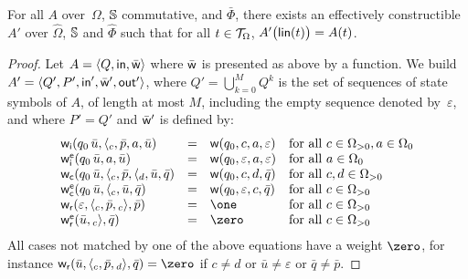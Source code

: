 \begin{proposition}\label{lem:SWTA}
For all \SWTA $A$ over~$\Omega$, $\mathbb{S}$ commutative, and $\bar\Phi$,
there exists an effectively constructible \SWVPA $A'$ over
$\hat\Omega$, $\mathbb{S}$ and $\hat\Phi$
such that for all $t \in \mathcal{T}_\Omega$, $A'\bigl(\mathsf{lin}(t)\bigr) = A(t)$.
\end{proposition}
%
\begin{proof}
Let $A = \< Q, \init, \bar{\wei} >$ where $\bar{\mathsf{w}}$ is presented as above by a function.
We build
$A' = \< Q', P', \init', \bar{\wei}', \final' >$,
where $Q' = \bigcup_{k=0}^{M} Q^k$ is the set of sequences of state symbols of $A$,
of length at most $M$, including the empty sequence denoted by~$\varepsilon$,
and where $P' = Q'$ and $\bar{\mathsf{w}}'$ is defined by:
\[
\begin{array}{lcll}
\weii(q_0\, \bar{u}, {\call{c}}, \bar{p}, a, \bar{u}) & = & \wei(q_0, c, a, \varepsilon) &
\mathrm{for~all~} c \in \Omega_{>0}, a \in \Omega_0\\ %
%
\weiei(q_0\,\bar{u}, a, \bar{u}) & = & \wei(q_0, \varepsilon, a, \varepsilon) &
\mathrm{for~all~} a \in \Omega_0\\
%
\weic(q_0\,\bar{u}, {\call{c}}, \bar{p}, \call{d}, \bar{u}, \bar{q}) & = & \wei(q_0, c, d, \bar{q}) &
\mathrm{for~all~} c, d \in \Omega_{>0}\\ %
%
\weiec(q_0\,\bar{u}, \call{c}, \bar{u}, \bar{q}) & = & \wei(q_0, \varepsilon, c, \bar{q}) &
\mathrm{for~all~} c \in \Omega_{>0}\\
%
\weir(\varepsilon, {\call{c}}, \bar{p}, {\return{c}}, \bar{p}) & = & \one &
\mathrm{for~all~}  c \in \Omega_{>0}\\ %
%
\weier(\bar{u}, {\return{c}}, \bar{q}) & = & \zero &
\mathrm{for~all~}  c \in \Omega_{>0}
\end{array}
\]
\noindent
All cases not matched by one of the above equations have a weight $\zero$,
for instance  %
$\weir(\bar{u}, {\call{c}}, \bar{p}, {\return{d}}, \bar{q}) = \zero$
if $c \neq d$
or $\bar{u} \neq \varepsilon$
or $\bar{q} \neq \bar{p}$.
%
\end{proof}

